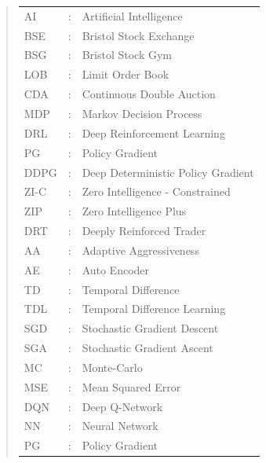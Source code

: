 \documentclass[ %
                    author={Ashwinder Khurana},
                supervisor={Prof Dave Cliff},
                    degree={MEng},
                     title={The Deeply Reinforced Trader},
                  subtitle={},
                      type={enterprise},
                      year={2020} ]{dissertation}
\begin{document}
\begin{quote}
\noindent
\begin{tabular}{lcl}
AI         &:     & Artificial Intelligence                         \\
BSE     &:     & Bristol Stock Exchange                     \\
BSG    &:      & Bristol Stock Gym                              \\
LOB    &:     & Limit Order Book                                \\
CDA    &:     & Continuous Double Auction                \\
MDP   &:      & Markov Decision Process                  \\
DRL     &:     & Deep Reinforcement Learning           \\
PG      &:      & Policy Gradient                                   \\
DDPG &:      & Deep Deterministic Policy Gradient    \\
ZI-C    &:       & Zero Intelligence - Constrained          \\
ZIP     &:      & Zero Intelligence Plus                          \\
DRT   &:      & Deeply Reinforced Trader                    \\
AA      &:      & Adaptive Aggressiveness                     \\
AE      &:      & Auto Encoder                                       \\
TD      &:      & Temporal Difference                            \\
TDL    &:      & Temporal Difference Learning             \\
SGD   &:      & Stochastic Gradient Descent               \\
SGA   &:      & Stochastic Gradient Ascent                  \\
MC     &:      & Monte-Carlo                                         \\
MSE   &:      & Mean Squared Error                            \\
DQN   &:      & Deep Q-Network                                  \\
NN      &:      & Neural Network                                    \\
PG      &:      & Policy Gradient                                     \\


\end{tabular}
\end{quote}
\end{document}
